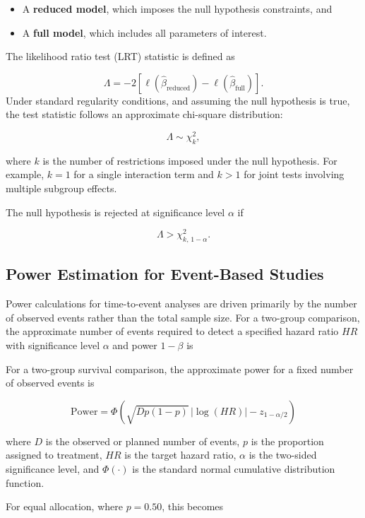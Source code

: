 \documentclass[
  letterpaper,
  DIV=11,
  numbers=noendperiod]{scrartcl}
\providecommand{\tightlist}{%
  \setlength{\itemsep}{0pt}\setlength{\parskip}{0pt}}\usepackage{longtable,booktabs,array}
\begin{document}
\begin{itemize}
\tightlist
\item
  A \textbf{reduced model}, which imposes the null hypothesis
  constraints, and\\
\item
  A \textbf{full model}, which includes all parameters of interest.
\end{itemize}

The likelihood ratio test (LRT) statistic is defined as

\[
\Lambda = -2\left[\ell(\hat{\beta}_{\text{reduced}}) - \ell(\hat{\beta}_{\text{full}})\right].
\] Under standard regularity conditions, and assuming the null
hypothesis is true, the test statistic follows an approximate chi-square
distribution:

\[
\Lambda \sim \chi^2_k,
\]

where \(k\) is the number of restrictions imposed under the null
hypothesis. For example, \(k = 1\) for a single interaction term and
\(k > 1\) for joint tests involving multiple subgroup effects.

The null hypothesis is rejected at significance level \(\alpha\) if

\[
\Lambda > \chi^2_{k,\,1-\alpha}.
\]

\subsection{Power Estimation for Event-Based
Studies}\label{power-estimation-for-event-based-studies}

Power calculations for time-to-event analyses are driven primarily by
the number of observed events rather than the total sample size. For a
two-group comparison, the approximate number of events required to
detect a specified hazard ratio \(HR\) with significance level
\(\alpha\) and power \(1-\beta\) is

For a two-group survival comparison, the approximate power for a fixed
number of observed events is

\[
\text{Power}
=
\Phi\left(
\sqrt{D p(1-p)}\,|\log(HR)|
-
z_{1-\alpha/2}
\right)
\]

where \(D\) is the observed or planned number of events, \(p\) is the
proportion assigned to treatment, \(HR\) is the target hazard ratio,
\(\alpha\) is the two-sided significance level, and \(\Phi(\cdot)\) is
the standard normal cumulative distribution function.

For equal allocation, where \(p = 0.50\), this becomes
\end{document}
